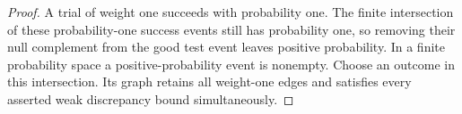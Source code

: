 \begin{proof}
A trial of weight one succeeds with probability one. The finite
intersection of these probability-one success events still has
probability one, so removing their null complement from the good
test event leaves positive probability. In a finite probability
space a positive-probability event is nonempty. Choose an outcome
in this intersection. Its graph retains all weight-one edges and
satisfies every asserted weak discrepancy bound simultaneously.
\end{proof}

